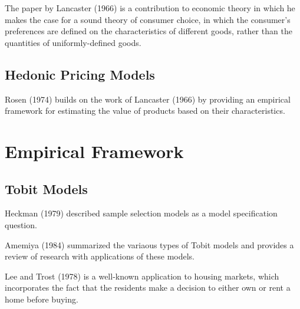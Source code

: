 The paper by Lancaster (1966) is a contribution to economic theory in which he makes the case for a sound theory of consumer choice, 
in which the consumer's preferences are defined on the characteristics of different goods, 
rather than the quantities of uniformly-defined goods.


\subsection{Hedonic Pricing Models}

Rosen (1974) builds on the work of Lancaster (1966)
by providing an empirical framework for estimating the value
of products based on their characteristics. 




\section{Empirical Framework}

\subsection{Tobit Models}

Heckman (1979) described sample selection models as a model specification question. 

Amemiya (1984) summarized the variaous types of Tobit models
and provides a review of research with applications of these models. 

Lee and Trost (1978) is a well-known application to housing markets, 
which incorporates the fact that the residents make a decision
to either own or rent a home before buying. 


% 